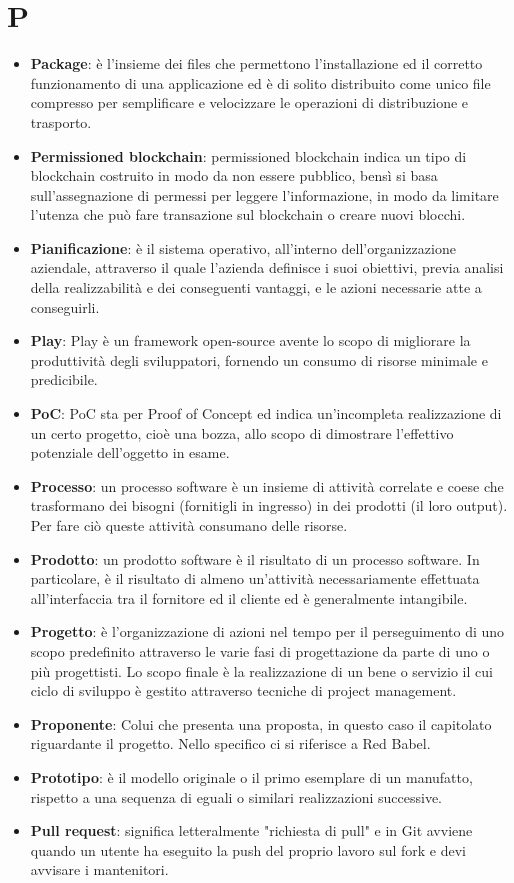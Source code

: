 \documentclass[a4paper, oneside, openany]{article}
\begin{document}
\section{P}
\begin{itemize}
\item \textbf{Package}: è l'insieme dei files che permettono l'installazione ed il corretto funzionamento di una applicazione ed è di solito distribuito come unico file compresso per semplificare e velocizzare le operazioni di distribuzione e trasporto.
\item \textbf{Permissioned blockchain}: permissioned blockchain indica un tipo di blockchain costruito in modo da non essere pubblico, bensì si basa sull'assegnazione di permessi per leggere l'informazione, in modo da limitare l'utenza che può fare transazione sul blockchain o creare nuovi blocchi.
\item \textbf{Pianificazione}: è il sistema operativo, all'interno dell'organizzazione aziendale, attraverso il quale l'azienda definisce i suoi obiettivi, previa analisi della realizzabilità e dei conseguenti vantaggi, e le azioni necessarie atte a conseguirli.
\item \textbf{Play}: Play è un framework open-source avente lo scopo di migliorare la produttività degli sviluppatori, fornendo un consumo di risorse minimale e predicibile.
\item \textbf{PoC}: PoC sta per Proof of Concept ed indica un'incompleta realizzazione di un certo progetto, cioè una bozza, allo scopo di dimostrare l'effettivo potenziale dell'oggetto in esame.
\item \textbf{Processo}: un processo software è un insieme di attività correlate e coese che trasformano dei bisogni (fornitigli in ingresso) in dei prodotti (il loro output).
Per fare ciò queste attività consumano delle risorse.%
\item \textbf{Prodotto}: un prodotto software è il risultato di un processo software. In particolare, è il risultato di almeno un'attività necessariamente effettuata all’interfaccia tra il fornitore ed il cliente ed è generalmente intangibile.
\item \textbf{Progetto}: è l'organizzazione di azioni nel tempo per il perseguimento di uno scopo predefinito attraverso le varie fasi di progettazione da parte di uno o più progettisti. Lo scopo finale è la realizzazione di un bene o servizio il cui ciclo di sviluppo è gestito attraverso tecniche di project management.
\item \textbf{Proponente}: Colui che presenta una proposta, in questo caso il capitolato riguardante il progetto. Nello specifico ci si riferisce a Red Babel.
\item \textbf{Prototipo}: è il modello originale o il primo esemplare di un manufatto, rispetto a una sequenza di eguali o similari realizzazioni successive.
\item \textbf{Pull request}: significa letteralmente "richiesta di pull" e in Git avviene quando un utente ha eseguito la push del proprio lavoro sul fork e devi avvisare i mantenitori.
\end{itemize}
\end{document}
